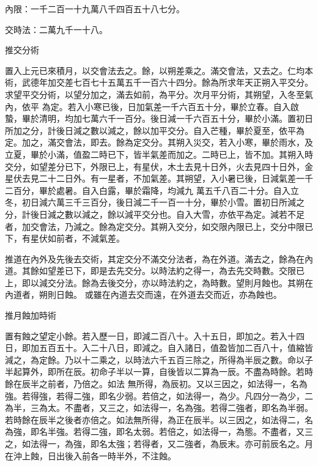 \begin{pinyinscope}
 內限：一千二百一十九萬八千四百五十八七分。



 交時法：二萬九千一十八。



 推交分術



 置入上元已來積月，以交會法去之。餘，以朔差乘之。滿交會法，又去之。仁均本術，武德年加交差七百七十五萬五千一百六十四分。餘為所求年天正朔入平交分。求望平交分術，以望分加之，滿去如前，為平分。次月平分術，其朔望，入冬至氣內，依平
 為定。若入小寒已後，日加氣差一千六百五十分，畢於立春。自入啟蟄，畢於清明，均加七萬六千一百分。後日減一千六百五十分，畢於小滿。置初日所加之分，計後日減之數以減之，餘以加平交分。自入芒種，畢於夏至，依平為定。加之，滿交會法，即去。餘為定交分。其朔入災交，若入小寒，畢於雨水，及立夏，畢於小滿，值盈二時已下，皆半氣差而加之。二時已上，皆不加。其朔入時交分，如望差分已下，外限已上，有星伏，木土去見十日外，火去見四十日外，金星伏去見二十二日外。有一星者，不加氣差。其朔望，入小暑已後，日減氣差一千二百分，畢於處暑。自入白露，畢於霜降，均減九
 萬五千八百二十分。自入立冬，初日減六萬三千三百分，後日減二千一百一十分，畢於小雪。置初日所減之分，計後日減之數以減之，餘以減平交分也。自入大雪，亦依平為定。減若不足者，加交會法，乃減之。餘為定交分。其朔入交分，如交限內限已上，交分中限已下，有星伏如前者，不減氣差。



 推道在內外及先後去交術，其定交分不滿交分法者，為在外道。滿去之，餘為在內道。其餘如望差已下，即是去先交分。以時法約之得一，為去先交時數。交限已上，即以減交分法。餘為去後交分，亦以時法約之，為時數。望則月蝕也。其朔在內道者，朔則日蝕。
 或雖在內道去交而遠，在外道去交而近，亦為蝕也。



 推月蝕加時術



 置有蝕之望定小餘。若入歷一日，即減二百八十。入十五日，即加之。若入十四日，即加五百五十。入二十八日，即減之。自入諸日，值盈皆加二百八十，值縮皆減之，為定餘。乃以十二乘之，以時法六千五百三除之，所得為半辰之數。命以子半起算外，即所在辰。初命子半以一算，自後皆以二算為一辰。不盡為時餘。若時餘在辰半之前者，乃倍之。如法
 無所得，為辰初。又以三因之，如法得一，名為強。若得強，若得二強，即名少弱。若倍之，如法得一，為少。凡四分一為少，二為半，三為太。不盡者，又三之，如法得一，名為強。若得二強者，即名為半弱。若時餘在辰半之後者亦倍之。如法無所得，為正在辰半。以三因之，如法得二，名為強，即名半強。若得二強，即名太弱。若倍之，如法得一，為態。不盡者，又三之，如法得一，為強，即名太強；若得者，又二強者，為辰末。亦可前辰名之。月在沖上蝕，日出後入前各一時半外，不注蝕。




\end{pinyinscope}
